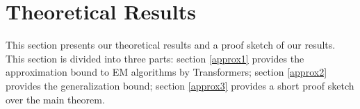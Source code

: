 \section{Theoretical Results}\label{sect3}
This section presents our theoretical results and a proof sketch of our results. This section is divided into three parts: section \ref{approx1} provides the approximation bound to EM algorithms by Transformers; section \ref{approx2} provides the generalization bound; section \ref{approx3} provides a short proof sketch over the main theorem.



